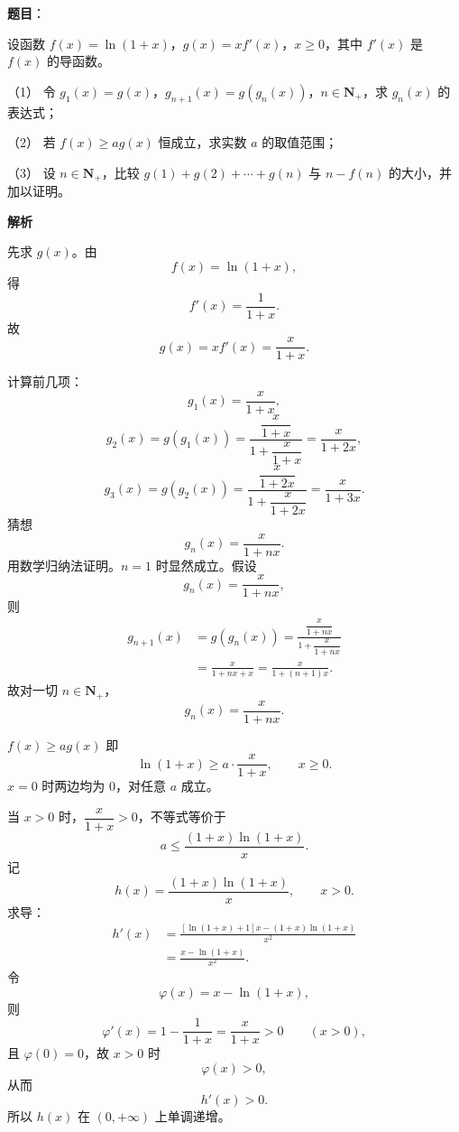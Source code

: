 \begin{answer}

\textbf{题目}：

设函数 $f(x)=\ln(1+x)$，$g(x)=xf'(x)$，$x\geqslant 0$，其中 $f'(x)$ 是 $f(x)$ 的导函数。

（1） 令 $g_1(x)=g(x)$，$g_{n+1}(x)=g(g_n(x))$，$n\in\mathbf N_+$，求 $g_n(x)$ 的表达式；

（2） 若 $f(x)\geqslant ag(x)$ 恒成立，求实数 $a$ 的取值范围；

（3） 设 $n\in\mathbf N_+$，比较 $g(1)+g(2)+\cdots+g(n)$ 与 $n-f(n)$ 的大小，并加以证明。

\textbf{解析}


先求 $g(x)$。由
\nopagebreak[4]
\[f(x)=\ln(1+x),\]
得
\nopagebreak[4]
\[f'(x)=\frac1{1+x}.\]
故
\nopagebreak[4]
\[g(x)=xf'(x)=\frac{x}{1+x}.\]

计算前几项：
\nopagebreak[4]
\[g_1(x)=\frac{x}{1+x},\]
\nopagebreak[4]
\[g_2(x)=g(g_1(x))
=\frac{\dfrac{x}{1+x}}{1+\dfrac{x}{1+x}}
=\frac{x}{1+2x},\]
\nopagebreak[4]
\[g_3(x)=g(g_2(x))
=\frac{\dfrac{x}{1+2x}}{1+\dfrac{x}{1+2x}}
=\frac{x}{1+3x}.\]
猜想
\nopagebreak[4]
\[g_n(x)=\frac{x}{1+nx}.\]
用数学归纳法证明。$n=1$ 时显然成立。假设
\nopagebreak[4]
\[g_n(x)=\frac{x}{1+nx},\]
则
\nopagebreak[4]
\[\begin{aligned}
g_{n+1}(x)
&=g(g_n(x))
=\frac{\dfrac{x}{1+nx}}{1+\dfrac{x}{1+nx}}\\
&=\frac{x}{1+nx+x}
=\frac{x}{1+(n+1)x}.
\end{aligned}\]
故对一切 $n\in\mathbf N_+$，
\nopagebreak[4]
\[g_n(x)=\frac{x}{1+nx}.\]


$f(x)\geqslant ag(x)$ 即
\nopagebreak[4]
\[\ln(1+x)\geqslant a\cdot\frac{x}{1+x},\qquad x\geqslant0.\]
$x=0$ 时两边均为 $0$，对任意 $a$ 成立。

当 $x>0$ 时，$\dfrac{x}{1+x}>0$，不等式等价于
\nopagebreak[4]
\[a\leqslant\frac{(1+x)\ln(1+x)}{x}.\]
记
\nopagebreak[4]
\[h(x)=\frac{(1+x)\ln(1+x)}{x},\qquad x>0.\]
求导：
\nopagebreak[4]
\[\begin{aligned}
h'(x)&=\frac{\left[\ln(1+x)+1\right]x-(1+x)\ln(1+x)}{x^2}\\
&=\frac{x-\ln(1+x)}{x^2}.
\end{aligned}\]
令
\nopagebreak[4]
\[\varphi(x)=x-\ln(1+x),\]
则
\nopagebreak[4]
\[\varphi'(x)=1-\frac1{1+x}=\frac{x}{1+x}>0\qquad(x>0),\]
且 $\varphi(0)=0$，故 $x>0$ 时
\nopagebreak[4]
\[\varphi(x)>0,\]
从而
\nopagebreak[4]
\[h'(x)>0.\]
所以 $h(x)$ 在 $(0,+\infty)$ 上单调递增。


\end{answer}
